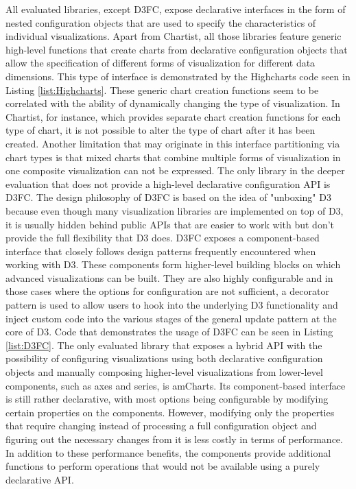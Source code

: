 All evaluated libraries, except D3FC, expose declarative interfaces in the form of nested configuration objects that are used to specify the characteristics of individual visualizations. 
Apart from Chartist, all those libraries feature generic high-level functions that create charts from declarative configuration objects that allow the specification of different forms of visualization for different data dimensions. 
This type of interface is demonstrated by the Highcharts code seen in Listing \ref{list:Highcharts}. 
These generic chart creation functions seem to be correlated with the ability of dynamically changing the type of visualization. 
In Chartist, for instance, which provides separate chart creation functions for each type of chart, it is not possible to alter the type of chart after it has been created. 
Another limitation that may originate in this interface partitioning via chart types is that mixed charts that combine multiple forms of visualization in one composite visualization can not be expressed. 
The only library in the deeper evaluation that does not provide a high-level declarative configuration API is D3FC. 
The design philosophy of D3FC is based on the idea of "unboxing" D3 because even though many visualization libraries are implemented on top of D3, it is usually hidden behind public APIs that are easier to work with but don't provide the full flexibility that D3 does. 
D3FC exposes a component-based interface that closely follows design patterns frequently encountered when working with D3. 
These components form higher-level building blocks on which advanced visualizations can be built. 
They are also highly configurable and in those cases where the options for configuration are not sufficient, a decorator pattern is used to allow users to hook into the underlying D3 functionality and inject custom code into the various stages of the general update pattern at the core of D3.
Code that demonstrates the usage of D3FC can be seen in Listing \ref{list:D3FC}. 
The only evaluated library that exposes a hybrid API with the possibility of configuring visualizations using both declarative configuration objects and manually composing higher-level visualizations from lower-level components, such as axes and series, is amCharts.
Its component-based interface is still rather declarative, with most options being configurable by modifying certain properties on the components.
However, modifying only the properties that require changing instead of processing a full configuration object and figuring out the necessary changes from it is less costly in terms of performance. 
In addition to these performance benefits, the components provide additional functions to perform operations that would not be available using a purely declarative API.

